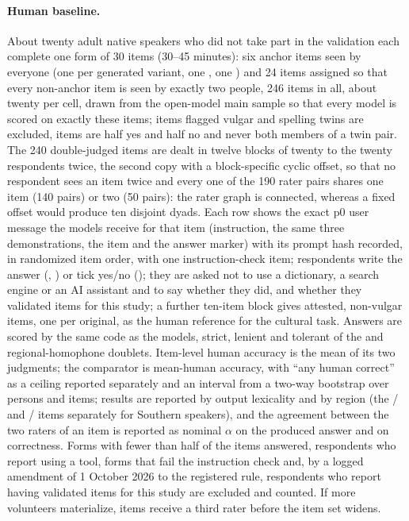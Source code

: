 \paragraph{Human baseline.}
About twenty adult native speakers who did not take part in the validation each complete one form of 30 items (30--45 minutes): six anchor items seen by everyone (one per generated variant, one , one ) and 24 items assigned so that every non-anchor item is seen by exactly two people, 246 items in all, about twenty per cell, drawn from the open-model main sample so that every model is scored on exactly these items; items flagged vulgar and spelling twins are excluded,  items are half yes and half no and never both members of a twin pair. The 240 double-judged items are dealt in twelve blocks of twenty to the twenty respondents twice, the second copy with a block-specific cyclic offset, so that no respondent sees an item twice and every one of the 190 rater pairs shares one item (140 pairs) or two (50 pairs): the rater graph is connected, whereas a fixed offset would produce ten disjoint dyads. Each row shows the exact p0 user message the models receive for that item (instruction, the same three demonstrations, the item and the answer marker) with its prompt hash recorded, in randomized item order, with one instruction-check item; respondents write the answer (, ) or tick yes/no (); they are asked not to use a dictionary, a search engine or an AI assistant and to say whether they did, and whether they validated items for this study; a further ten-item block gives attested, non-vulgar  items, one per original, as the human reference for the cultural task. Answers are scored by the same code as the models, strict, lenient and tolerant of the  and regional-homophone doublets. Item-level human accuracy is the mean of its two judgments; the comparator is mean-human accuracy, with ``any human correct'' as a ceiling reported separately and an interval from a two-way bootstrap over persons and items; results are reported by output lexicality and by region (the / and / items separately for Southern speakers), and the agreement between the two raters of an item is reported as nominal $\alpha$ on the produced answer and on correctness. Forms with fewer than half of the items answered, respondents who report using a tool, forms that fail the instruction check and, by a logged amendment of 1 October 2026 to the registered rule, respondents who report having validated items for this study are excluded and counted. If more volunteers materialize, items receive a third rater before the item set widens.


